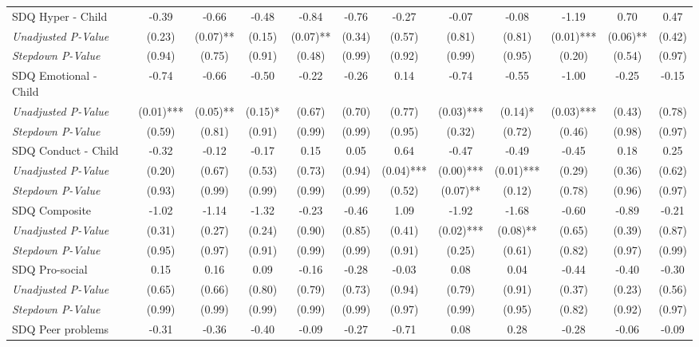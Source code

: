 \begin{tabular}{l c c c c c c c c c c c}
SDQ Hyper - Child & -0.39 & -0.66 & -0.48 & -0.84 & -0.76 & -0.27 & -0.07 & -0.08 & -1.19 & 0.70 & 0.47 \\
\quad \textit{Unadjusted P-Value} & (0.23) & (0.07)** & (0.15) & (0.07)** & (0.34) & (0.57) & (0.81) & (0.81) & (0.01)*** & (0.06)** & (0.42) \\
\quad \textit{Stepdown P-Value} & (0.94) & (0.75) & (0.91) & (0.48) & (0.99) & (0.92) & (0.99) & (0.95) & (0.20) & (0.54) & (0.97) \\
SDQ Emotional - Child & -0.74 & -0.66 & -0.50 & -0.22 & -0.26 & 0.14 & -0.74 & -0.55 & -1.00 & -0.25 & -0.15 \\
\quad \textit{Unadjusted P-Value} & (0.01)*** & (0.05)** & (0.15)* & (0.67) & (0.70) & (0.77) & (0.03)*** & (0.14)* & (0.03)*** & (0.43) & (0.78) \\
\quad \textit{Stepdown P-Value} & (0.59) & (0.81) & (0.91) & (0.99) & (0.99) & (0.95) & (0.32) & (0.72) & (0.46) & (0.98) & (0.97) \\
SDQ Conduct - Child & -0.32 & -0.12 & -0.17 & 0.15 & 0.05 & 0.64 & -0.47 & -0.49 & -0.45 & 0.18 & 0.25 \\
\quad \textit{Unadjusted P-Value} & (0.20) & (0.67) & (0.53) & (0.73) & (0.94) & (0.04)*** & (0.00)*** & (0.01)*** & (0.29) & (0.36) & (0.62) \\
\quad \textit{Stepdown P-Value} & (0.93) & (0.99) & (0.99) & (0.99) & (0.99) & (0.52) & (0.07)** & (0.12) & (0.78) & (0.96) & (0.97) \\
SDQ Composite & -1.02 & -1.14 & -1.32 & -0.23 & -0.46 & 1.09 & -1.92 & -1.68 & -0.60 & -0.89 & -0.21 \\
\quad \textit{Unadjusted P-Value} & (0.31) & (0.27) & (0.24) & (0.90) & (0.85) & (0.41) & (0.02)*** & (0.08)** & (0.65) & (0.39) & (0.87) \\
\quad \textit{Stepdown P-Value} & (0.95) & (0.97) & (0.91) & (0.99) & (0.99) & (0.91) & (0.25) & (0.61) & (0.82) & (0.97) & (0.99) \\
SDQ Pro-social & 0.15 & 0.16 & 0.09 & -0.16 & -0.28 & -0.03 & 0.08 & 0.04 & -0.44 & -0.40 & -0.30 \\
\quad \textit{Unadjusted P-Value} & (0.65) & (0.66) & (0.80) & (0.79) & (0.73) & (0.94) & (0.79) & (0.91) & (0.37) & (0.23) & (0.56) \\
\quad \textit{Stepdown P-Value} & (0.99) & (0.99) & (0.99) & (0.99) & (0.99) & (0.97) & (0.99) & (0.95) & (0.82) & (0.92) & (0.97) \\
SDQ Peer problems & -0.31 & -0.36 & -0.40 & -0.09 & -0.27 & -0.71 & 0.08 & 0.28 & -0.28 & -0.06 & -0.09 \\

\end{tabular}

